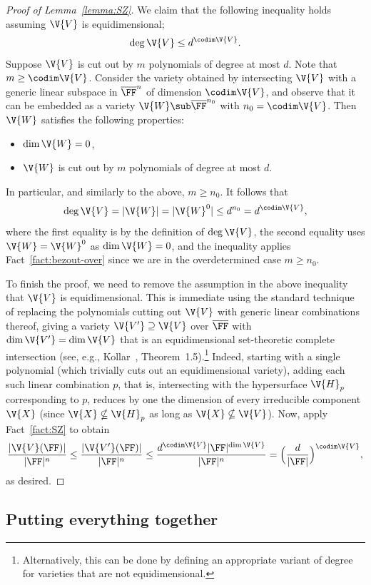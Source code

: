 \begin{proof}[Proof of Lemma~\ref{lemma:SZ}]
We claim that the following inequality holds
assuming $\V{V}$ is equidimensional;
$$\deg \V{V} \le d^{\codim \V{V}}.$$
Suppose $\V{V}$ is cut out by $m$ polynomials of degree at most $d$. 
Note that $m \ge \codim\V{V}$.
Consider the variety obtained by intersecting $\V{V}$ with a generic linear subspace in $\overline{\FF}^n$ of dimension $\codim\V{V}$, 
and observe that it can be embedded as a variety $\V{W} \sub \overline{\FF}^{n_0}$ with $n_0=\codim\V{V}$.
Then $\V{W}$ satisfies the following properties:
\begin{itemize}
	\item $\dim\V{W} = 0$,
	\item $\V{W}$ is cut out by $m$ polynomials of degree at most $d$.
\end{itemize}	
In particular, and similarly to the above, $m \ge n_0$.
It follows that 
$$\deg \V{V} = |\V{W}| = |\V{W}^0| \le d^{n_0} = d^{\codim\V{V}},$$
where the first equality is by the definition of $\deg\V{V}$, the second equality uses $\V{W}=\V{W}^0$ as $\dim\V{W}=0$, 
and the inequality applies Fact~\ref{fact:bezout-over} since we are in the overdetermined case $m \ge n_0$.

To finish the proof, we need to remove the assumption in the above inequality that $\V{V}$ is equidimensional.
This is immediate using the standard technique of replacing the polynomials cutting out $\V{V}$ with generic linear combinations thereof, giving a variety $\V{V'} \supseteq \V{V}$ over $\overline{\FF}$ with $\dim\V{V'}=\dim\V{V}$ that is an equidimensional set-theoretic complete intersection (see, e.g., Kollar~\cite{Kollar88}, Theorem~1.5).\footnote{Alternatively, this can be done by defining an appropriate variant of degree for varieties that are not equidimensional.}
Indeed, 
starting with a single polynomial (which trivially cuts out an equidimensional variety), 
adding each such linear combination $p$, 
that is, intersecting with the hypersurface $\V{H}_p$ corresponding to $p$, reduces by one the dimension of every irreducible component $\V{X}$
(since $\V{X} \nsubseteq \V{H}_p$ as long as $\V{X} \nsubseteq \V{V}$).
Now, apply Fact~\ref{fact:SZ} to obtain
$$\frac{|\V{V}(\FF)|}{|\FF|^n} 
\le \frac{|\V{V'}(\FF)|}{|\FF|^n} 
\le \frac{d^{\codim\V{V}}|\FF|^{\dim\V{V}}}{|\FF|^n}
= \Big(\frac{d}{|\FF|}\Big)^{\codim\V{V}},$$
as desired.
\end{proof}


\subsection{Putting everything together}

